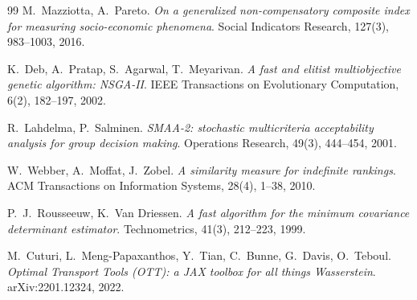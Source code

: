 \documentclass[11pt,a4paper]{article}
\theoremstyle{definition}
\theoremstyle{remark}
\begin{document}
\begin{thebibliography}{99}
M.~Mazziotta, A.~Pareto.
\emph{On a generalized non-compensatory composite index for measuring socio-economic phenomena}.
Social Indicators Research, 127(3), 983--1003, 2016.

K.~Deb, A.~Pratap, S.~Agarwal, T.~Meyarivan.
\emph{A fast and elitist multiobjective genetic algorithm: NSGA-II}.
IEEE Transactions on Evolutionary Computation, 6(2), 182--197, 2002.

R.~Lahdelma, P.~Salminen.
\emph{SMAA-2: stochastic multicriteria acceptability analysis for group decision making}.
Operations Research, 49(3), 444--454, 2001.

W.~Webber, A.~Moffat, J.~Zobel.
\emph{A similarity measure for indefinite rankings}.
ACM Transactions on Information Systems, 28(4), 1--38, 2010.

P.~J.~Rousseeuw, K.~Van Driessen.
\emph{A fast algorithm for the minimum covariance determinant estimator}.
Technometrics, 41(3), 212--223, 1999.

M.~Cuturi, L.~Meng-Papaxanthos, Y.~Tian, C.~Bunne, G.~Davis, O.~Teboul.
\emph{Optimal Transport Tools (OTT): a JAX toolbox for all things Wasserstein}.
arXiv:2201.12324, 2022.

\end{thebibliography}
\end{document}
